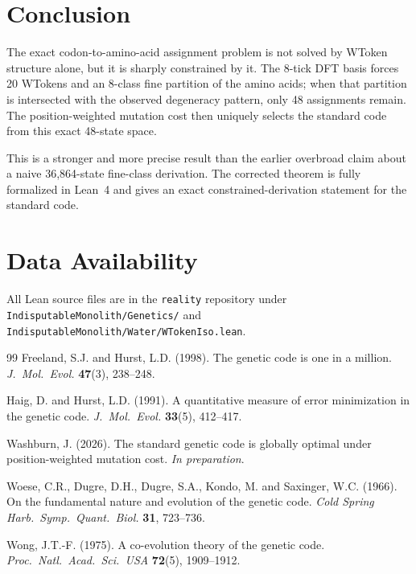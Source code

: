 \documentclass[11pt,twocolumn]{article}
\begin{document}
\section{Conclusion}

The exact codon-to-amino-acid assignment problem is not solved by WToken
structure alone, but it is sharply constrained by it. The 8-tick DFT basis
forces 20 WTokens and an 8-class fine partition of the amino acids; when
that partition is intersected with the observed degeneracy pattern, only 48
assignments remain. The position-weighted mutation cost then uniquely
selects the standard code from this exact 48-state space.

This is a stronger and more precise result than the earlier overbroad claim
about a naive 36,864-state fine-class derivation. The corrected theorem is
fully formalized in Lean~4 and gives an exact constrained-derivation
statement for the standard code.

\section*{Data Availability}

All Lean source files are in the \texttt{reality} repository under
\texttt{IndisputableMonolith/Genetics/} and
\texttt{IndisputableMonolith/Water/WTokenIso.lean}.

\begin{thebibliography}{99}
Freeland, S.J. and Hurst, L.D. (1998). The genetic code is one in a
million. \textit{J.~Mol.~Evol.} \textbf{47}(3), 238--248.

Haig, D. and Hurst, L.D. (1991). A quantitative measure of error
minimization in the genetic code. \textit{J.~Mol.~Evol.} \textbf{33}(5),
412--417.

Washburn, J. (2026). The standard genetic code is globally optimal under
position-weighted mutation cost. \textit{In preparation}.

Woese, C.R., Dugre, D.H., Dugre, S.A., Kondo, M. and Saxinger, W.C.
(1966). On the fundamental nature and evolution of the genetic code.
\textit{Cold Spring Harb.~Symp.~Quant.~Biol.} \textbf{31}, 723--736.

Wong, J.T.-F. (1975). A co-evolution theory of the genetic code.
\textit{Proc.~Natl.~Acad.~Sci.~USA} \textbf{72}(5), 1909--1912.
\end{thebibliography}
\end{document}
